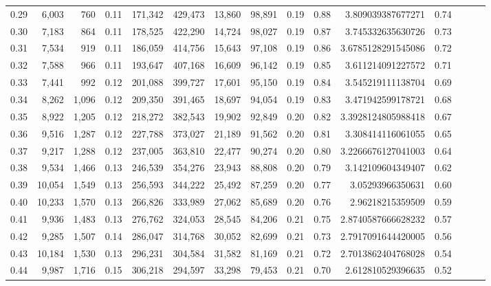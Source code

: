 \begin{tabular}{rrrrrrrrrrrrrrr}
0.29 &   6,003 &    760 &  0.11 &  171,342 &  429,473 &   13,860 &   98,891 &  0.19 &  0.88 &     3.809039387677271 &      0.74 \\
0.30 &   7,183 &    864 &  0.11 &  178,525 &  422,290 &   14,724 &   98,027 &  0.19 &  0.87 &     3.745332635630726 &      0.73 \\
0.31 &   7,534 &    919 &  0.11 &  186,059 &  414,756 &   15,643 &   97,108 &  0.19 &  0.86 &    3.6785128291545086 &      0.72 \\
0.32 &   7,588 &    966 &  0.11 &  193,647 &  407,168 &   16,609 &   96,142 &  0.19 &  0.85 &     3.611214091227572 &      0.71 \\
0.33 &   7,441 &    992 &  0.12 &  201,088 &  399,727 &   17,601 &   95,150 &  0.19 &  0.84 &     3.545219111138704 &      0.69 \\
0.34 &   8,262 &  1,096 &  0.12 &  209,350 &  391,465 &   18,697 &   94,054 &  0.19 &  0.83 &     3.471942599178721 &      0.68 \\
0.35 &   8,922 &  1,205 &  0.12 &  218,272 &  382,543 &   19,902 &   92,849 &  0.20 &  0.82 &    3.3928124805988418 &      0.67 \\
0.36 &   9,516 &  1,287 &  0.12 &  227,788 &  373,027 &   21,189 &   91,562 &  0.20 &  0.81 &     3.308414116061055 &      0.65 \\
0.37 &   9,217 &  1,288 &  0.12 &  237,005 &  363,810 &   22,477 &   90,274 &  0.20 &  0.80 &    3.2266676127041003 &      0.64 \\
0.38 &   9,534 &  1,466 &  0.13 &  246,539 &  354,276 &   23,943 &   88,808 &  0.20 &  0.79 &     3.142109604349407 &      0.62 \\
0.39 &  10,054 &  1,549 &  0.13 &  256,593 &  344,222 &   25,492 &   87,259 &  0.20 &  0.77 &      3.05293966350631 &      0.60 \\
0.40 &  10,233 &  1,570 &  0.13 &  266,826 &  333,989 &   27,062 &   85,689 &  0.20 &  0.76 &      2.96218215359509 &      0.59 \\
0.41 &   9,936 &  1,483 &  0.13 &  276,762 &  324,053 &   28,545 &   84,206 &  0.21 &  0.75 &    2.8740587666628232 &      0.57 \\
0.42 &   9,285 &  1,507 &  0.14 &  286,047 &  314,768 &   30,052 &   82,699 &  0.21 &  0.73 &    2.7917091644420005 &      0.56 \\
0.43 &  10,184 &  1,530 &  0.13 &  296,231 &  304,584 &   31,582 &   81,169 &  0.21 &  0.72 &    2.7013862404768028 &      0.54 \\
0.44 &   9,987 &  1,716 &  0.15 &  306,218 &  294,597 &   33,298 &   79,453 &  0.21 &  0.70 &     2.612810529396635 &      0.52 \\

\end{tabular}
